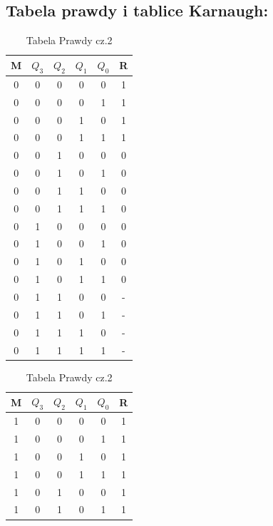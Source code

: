 \documentclass[12pt,a4paper]{article}
\begin{document}
		\subsection{Tabela prawdy i tablice Karnaugh:}
			\begin{table}[H]
				\begin{minipage}{.5\textwidth}
					\caption{Tabela Prawdy cz.1}
					\vspace{0.2cm}
					\centering
					\begin{tabular}{ccccc|c}
						M	&\(Q_3\)&\(Q_2\)&\(Q_1\)&\(Q_0\)&	R	\\\hline
						0	&	0	&	0	&	0	&	0	&	1	\\
						0	&	0	&	0	&	0	&	1	&	1	\\
						0	&	0	&	0	&	1	&	0	&	1	\\
						0	&	0	&	0	&	1	&	1	&	1	\\\hline
						0	&	0	&	1	&	0	&	0	&	0	\\
						0	&	0	&	1	&	0	&	1	&	0	\\
						0	&	0	&	1	&	1	&	0	&	0	\\
						0	&	0	&	1	&	1	&	1	&	0	\\\hline
						0	&	1	&	0	&	0	&	0	&	0	\\
						0	&	1	&	0	&	0	&	1	&	0	\\
						0	&	1	&	0	&	1	&	0	&	0	\\
						0	&	1	&	0	&	1	&	1	&	0	\\\hline
						0	&	1	&	1	&	0	&	0	&	-	\\
						0	&	1	&	1	&	0	&	1	&	-	\\
						0	&	1	&	1	&	1	&	0	&	-	\\
						0	&	1	&	1	&	1	&	1	&	-	\\
					\end{tabular}
				\end{minipage}%
				\begin{minipage}{.5\textwidth}
					\caption{Tabela Prawdy cz.2}
					\vspace{0.2cm}
					\centering
					\begin{tabular}{ccccc|c}
						M	&\(Q_3\)&\(Q_2\)&\(Q_1\)&\(Q_0\)&	R	\\\hline
						1	&	0	&	0	&	0	&	0	&	1	\\
						1	&	0	&	0	&	0	&	1	&	1	\\
						1	&	0	&	0	&	1	&	0	&	1	\\
						1	&	0	&	0	&	1	&	1	&	1	\\\hline
						1	&	0	&	1	&	0	&	0	&	1	\\
						1	&	0	&	1	&	0	&	1	&	1	\\

\end{tabular}
\end{minipage}
\end{table}
\end{document}

